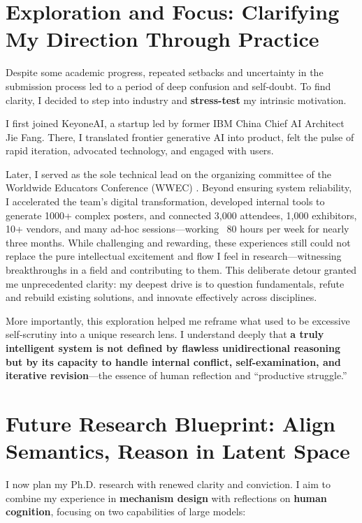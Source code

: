 \documentclass[11pt, letterpaper]{article}
\begin{document}
\section{Exploration and Focus: Clarifying My Direction Through Practice}

Despite some academic progress, repeated setbacks and uncertainty in the submission process led to a period of deep confusion and self-doubt. To find clarity, I decided to step into industry and \textbf{stress-test} my intrinsic motivation.

I first joined KeyoneAI, a startup led by former IBM China Chief AI Architect Jie Fang. There, I translated frontier generative AI into product, felt the pulse of rapid iteration, advocated technology, and engaged with users.

Later, I served as the sole technical lead on the organizing committee of the Worldwide Educators Conference (WWEC) \cite{wwec}. Beyond ensuring system reliability, I accelerated the team’s digital transformation, developed internal tools to generate 1000+ complex posters, and connected 3,000 attendees, 1,000 exhibitors, 10+ vendors, and many ad-hoc sessions—working ~80 hours per week for nearly three months. While challenging and rewarding, these experiences still could not replace the pure intellectual excitement and flow I feel in research—witnessing breakthroughs in a field and contributing to them. This deliberate detour granted me unprecedented clarity: my deepest drive is to question fundamentals, refute and rebuild existing solutions, and innovate effectively across disciplines.

More importantly, this exploration helped me reframe what used to be excessive self-scrutiny into a unique research lens. I understand deeply that \textbf{a truly intelligent system is not defined by flawless unidirectional reasoning but by its capacity to handle internal conflict, self-examination, and iterative revision}—the essence of human reflection and “productive struggle.”

\section{Future Research Blueprint: Align Semantics, Reason in Latent Space}

I now plan my Ph.D. research with renewed clarity and conviction. I aim to combine my experience in \textbf{mechanism design} with reflections on \textbf{human cognition}, focusing on two capabilities of large models:
\end{document}
